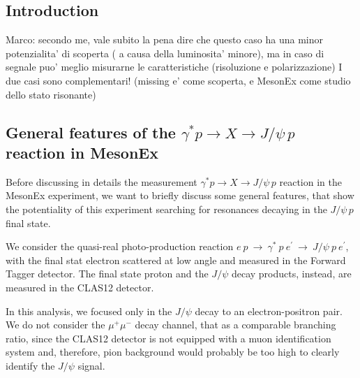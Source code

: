 \subsection{Introduction}

Marco: secondo me, vale subito la pena dire che questo caso ha una minor potenzialita' di scoperta ( a causa della luminosita' minore), ma in caso di segnale puo' meglio misurarne le caratteristiche (risoluzione e polarizzazione)
I due casi sono complementari! (missing e' come scoperta, e MesonEx come studio dello stato risonante)

\subsection{General features of the $\gamma^* p \rightarrow X \rightarrow J/\psi \, p$ reaction in MesonEx}

Before discussing in details the measurement $\gamma^* p \rightarrow X \rightarrow J/\psi \, p$ reaction in the MesonEx experiment, we want to briefly discuss some general features, that show the potentiality of this experiment searching for resonances decaying in the $J/\psi\, p$ final state. 

We consider the quasi-real photo-production reaction $e~p~\rightarrow~\gamma^*~p~e^{\prime}~\rightarrow~J/\psi~p~e^{\prime}$, with the final stat electron scattered at low angle and measured in the Forward Tagger detector. The final state proton and the $J/\psi$ decay products, instead, are measured in the CLAS12 detector.

In this analysis, we focused only in the $J/\psi$ decay to an electron-positron pair. We do not consider the $\mu^+ \mu^-$ decay channel, that as a comparable branching ratio, since the CLAS12 detector is not equipped with a muon identification system and, therefore, pion background would probably be too high to clearly identify the $J/\psi$ signal.


